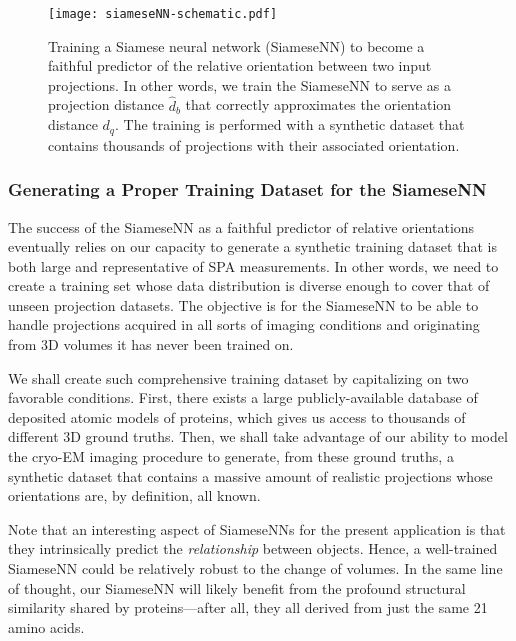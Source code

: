 \begin{figure}[t!]
    \centering
   \texttt{[image: siameseNN-schematic.pdf]}
    \caption{Training a Siamese neural network (SiameseNN) to become a faithful predictor of the relative orientation between two input projections. In other words, we train the SiameseNN to serve as a projection distance $\widehat{d}_b$ that correctly approximates the orientation distance $d_q$. The training is performed with a synthetic dataset that contains thousands of projections with their associated orientation.}
    \label{fig:siamese-schematic}
\end{figure}

\subsubsection{Generating a Proper Training Dataset for the SiameseNN}
\label{sec:training-siamese}

The success of the SiameseNN as a faithful predictor of relative orientations eventually relies on our capacity to generate a synthetic training dataset that is both large and representative of SPA measurements. In other words, we need to create a training set whose data distribution is diverse enough to cover that of unseen projection datasets. The objective is for the SiameseNN to be able to handle projections acquired in all sorts of imaging conditions and originating from 3D volumes it has never been trained on. 

We shall create such comprehensive training dataset by capitalizing on two favorable conditions. First, there exists a large publicly-available database of deposited atomic models of proteins, which gives us access to thousands of different 3D ground truths. Then, we shall take advantage of our ability to model the cryo-EM imaging procedure to generate, from these ground truths, a synthetic dataset that contains a massive amount of realistic projections whose orientations are, by definition, all known. 

Note that an interesting aspect of SiameseNNs for the present application is that they intrinsically predict the \textit{relationship} between objects. Hence, a well-trained SiameseNN could be relatively robust to the change of volumes. In the same line of thought, our SiameseNN will likely benefit from the profound structural similarity shared by proteins---after all, they all derived from just the same 21 amino acids.  


